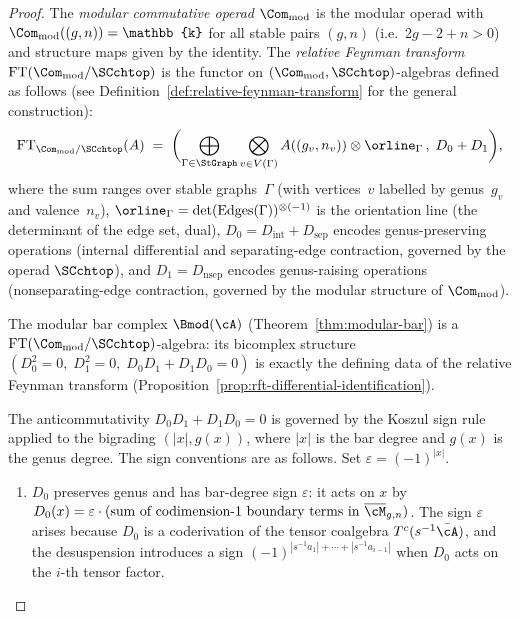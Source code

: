 \begin{proof}
The \emph{modular commutative operad} $\Com_{\mathrm{mod}}$ is
the modular operad with
$\Com_{\mathrm{mod}}((g,n)) = \mathbb{k}$ for all stable
pairs $(g,n)$ (i.e.\ $2g - 2 + n > 0$) and structure maps
given by the identity. The \emph{relative Feynman transform}
$\mathrm{FT}(\Com_{\mathrm{mod}} / \SCchtop)$ is the
functor on $(\Com_{\mathrm{mod}}, \SCchtop)$-algebras defined
as follows (see Definition~\ref{def:relative-feynman-transform}
for the general construction):
\[
 \mathrm{FT}_{\Com_{\mathrm{mod}} / \SCchtop}(A)
 \;=\;
 \biggl(
 \bigoplus_{\Gamma \in \StGraph}
 \bigotimes_{v \in V(\Gamma)}
 A((g_v, n_v)) \otimes \orline_\Gamma
 \,,\;
 D_0 + D_1
 \biggr),
\]
where the sum ranges over stable graphs~$\Gamma$ (with
vertices~$v$ labelled by genus~$g_v$ and valence~$n_v$),
$\orline_\Gamma = \det(\mathrm{Edges}(\Gamma))^{\otimes(-1)}$
is the orientation line (the determinant of the edge set, dual),
$D_0 = D_{\mathrm{int}} + D_{\mathrm{sep}}$ encodes
genus-preserving operations (internal differential and
separating-edge contraction, governed by the operad
$\SCchtop$), and
$D_1 = D_{\mathrm{nsep}}$ encodes genus-raising operations
(nonseparating-edge contraction, governed by the modular
structure of $\Com_{\mathrm{mod}}$).

The modular bar complex $\Bmod(\cA)$
(Theorem~\ref{thm:modular-bar}) is a
$\mathrm{FT}(\Com_{\mathrm{mod}} / \SCchtop)$-algebra:
its bicomplex structure $(D_0^2 = 0,\; D_1^2 = 0,\;
D_0 D_1 + D_1 D_0 = 0)$ is exactly the defining data of the
relative Feynman transform
(Proposition~\ref{prop:rft-differential-identification}).

\begin{remark}
\label{rem:bicomplex-signs}
The anticommutativity $D_0 D_1 + D_1 D_0 = 0$ is governed by the
Koszul sign rule applied to the bigrading $(|x|, g(x))$, where
$|x|$ is the bar degree and $g(x)$ is the genus degree. The sign
conventions are as follows. Set $\varepsilon = (-1)^{|x|}$.
\begin{enumerate}[label=\textup{(\roman*)}]
\item $D_0$ preserves genus and has bar-degree sign
 $\varepsilon$: it acts on $x$ by $D_0(x) = \varepsilon \cdot
 (\text{sum of codimension-1 boundary terms in } \Mbar_{g,n})$.
 The sign $\varepsilon$ arises because $D_0$ is a coderivation
 of the tensor coalgebra $T^c(s^{-1}\bar\cA)$, and the
 desuspension introduces a sign $(-1)^{|s^{-1}a_1| + \cdots +
 |s^{-1}a_{i-1}|}$ when $D_0$ acts on the $i$-th tensor factor.


\end{enumerate}
\end{remark}
\end{proof}
